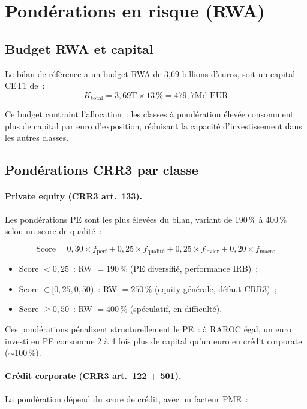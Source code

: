 \documentclass[12pt, a4paper, twoside, openright]{report}
\theoremstyle{definition}
\begin{document}
\section{Pondérations en risque (RWA)}
\label{sec:metriques:rwa}

\subsection{Budget RWA et capital}

Le bilan de référence a un budget RWA de 3{,}69 billions d'euros, soit un capital CET1 de~:
$$K_{\text{total}} = 3{,}69\text{T} \times 13\,\% = 479{,}7\text{Md EUR}$$

Ce budget contraint l'allocation~: les classes à pondération élevée consomment plus de capital par euro d'exposition, réduisant la capacité d'investissement dans les autres classes.

\subsection{Pondérations CRR3 par classe}

\paragraph{Private equity (CRR3 art.~133).} Les pondérations PE sont les plus élevées du bilan, variant de 190\,\% à 400\,\% selon un score de qualité~:

\begin{equation}
\text{Score} = 0{,}30 \times f_{\text{perf}} + 0{,}25 \times f_{\text{qualité}} + 0{,}25 \times f_{\text{levier}} + 0{,}20 \times f_{\text{macro}}
\label{eq:pe-score}
\end{equation}

\begin{itemize}[nosep]
  \item Score $< 0{,}25$~: RW $= 190\,\%$ (PE diversifié, performance IRB)~;
  \item Score $\in [0{,}25, 0{,}50)$~: RW $= 250\,\%$ (equity générale, défaut CRR3)~;
  \item Score $\geq 0{,}50$~: RW $= 400\,\%$ (spéculatif, en difficulté).
\end{itemize}

Ces pondérations pénalisent structurellement le PE~: à RAROC égal, un euro investi en PE consomme 2 à 4 fois plus de capital qu'un euro en crédit corporate ($\sim$100\,\%).

\paragraph{Crédit corporate (CRR3 art.~122 + 501).} La pondération dépend du score de crédit, avec un facteur PME~:
\end{document}
